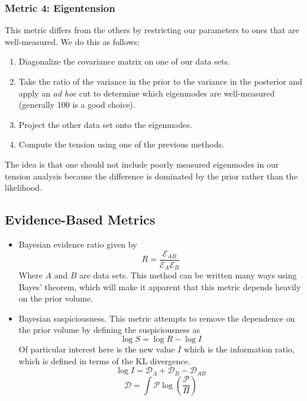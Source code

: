 \subsubsection{Metric 4: Eigentension}
This metric differs from the others by restricting our parameters to ones that are well-measured. We do this as follows:
\begin{enumerate}
	\item Diagonalize the covariance matrix on one of our data sets.
	\item Take the ratio of the variance in the prior to the variance in the posterior and apply an \textit{ad hoc} cut to determine which eigenmodes are well-measured (generally 100 is a good choice).
	\item Project the other data set onto the eigenmodes.
	\item Compute the tension using one of the previous methods.
\end{enumerate}
The idea is that one should not include poorly measured eigenmodes in our tension analysis because the difference is dominated by the prior rather than the likelihood.
\subsection{Evidence-Based Metrics}
\begin{itemize}
	\item Bayesian evidence ratio given by
	\begin{equation}
		R = \frac{\mathcal{E}_{AB}}{\mathcal{E}_A\mathcal{E}_B}
	\end{equation}
	Where $A$ and $B$ are data sets. This method can be written many ways using Bayes' theorem, which will make it apparent that this metric depends heavily on the prior volume.
    \item Bayesian suspiciousness. This metric attempts to remove the dependence on the prior volume by defining the suspiciousness as 
	\begin{equation}
		\log S = \log R - \log I
	\end{equation}
	Of particular interest here is the new value $I$ which is the information ratio, which is defined in terms of the KL divergence.
	\begin{equation}
		\log I = \mathcal{D}_A + \mathcal{D}_B - \mathcal{D}_{AB}
	\end{equation}
	\begin{equation}
		\mathcal{D} = \int \mathcal{P} \log(\frac{\mathcal{P}}{\Pi})
	\end{equation}
\end{itemize}
